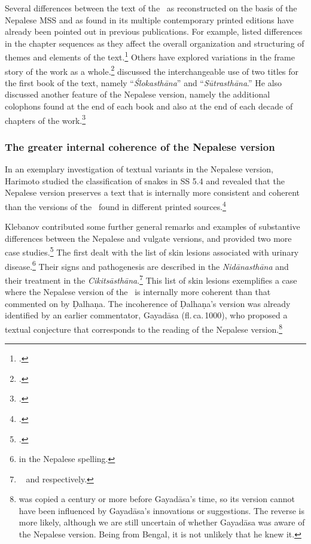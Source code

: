 
Several differences between the text of the \SS\ as reconstructed on the basis of
the Nepalese MSS and as found in its multiple contemporary printed editions have
already been pointed out in previous publications.  For example,
\citeauthor{kleb-2021b} listed differences in the chapter sequences as they
affect the overall organization and structuring of themes and elements of the
text.\footcite[27\,f.]{kleb-2021b} Others have explored variations in the frame
story of the work as a whole.\footcites{wuja-2013} [28-32]{kleb-2021b}
{birc-2021} [2-4]{birc-2021a} \citeauthor{kleb-2021b} discussed the
interchangeable use of two titles for the first book of the text, namely
“\emph{Ślokasthāna}” and “\emph{Sūtrasthāna}.” He also discussed another feature
of the Nepalese version, namely the additional colophons found at
the end of each book and also at the end of each decade of chapters of the
work.\footcite[32--44]{kleb-2021b}

\subsubsection{The greater internal coherence of the Nepalese version}

In an exemplary investigation of textual variants in the Nepalese version,
Harimoto studied the classification of snakes in SS 5.4 and revealed that the
Nepalese version preserves a text that is internally more consistent and coherent
than the versions of the \SS\ found in different printed
sources.\footcite[101–104]{hari-2011}

Klebanov contributed some further general remarks and examples of substantive
differences between the Nepalese and vulgate versions, and provided two more case
studies.\footcite[44--55]{kleb-2021b} The first dealt with the list of skin
lesions associated with urinary disease.\footnote{ in the
    Nepalese spelling.}  Their signs and pathogenesis are described in the
    \emph{Nidānasthāna} and their treatment in the \emph{Cikitsāsthāna}.\footnote{\SS\
         and  respectively.} This list of skin
        lesions exemplifies a case where the Nepalese version of the \SS\ is internally
        more coherent than that commented on by Ḍalhaṇa. The incoherence of Ḍalhaṇa's
        version was already identified by an earlier commentator, Gayadāsa
        (fl.\,ca.\,1000), who proposed a textual conjecture that corresponds to the
        reading of the Nepalese version.\footnote{\MScite{Kathmandu KL 699} was copied a
            century or more before Gayadāsa's time, so its version cannot have been 
            influenced
            by Gayadāsa's innovations or suggestions.  The reverse is more likely, although 
            we
            are still uncertain of whether Gayadāsa was aware of the Nepalese version. Being
            from Bengal, it is not unlikely that he knew it.}

